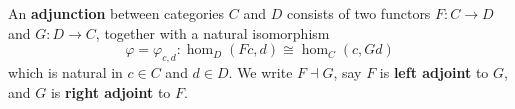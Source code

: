 An \textbf{adjunction} between categories $C$ and $D$ consists of two functors $F: C \rightarrow D$ and $G: D \rightarrow C$, together with a natural isomorphism
\[
\varphi = \varphi_{c,d}: \hom_D(Fc, d) \cong \hom_C(c, Gd)
\]
which is natural in $c \in C$ and $d \in D$. We write $F \dashv G$, say $F$ is \textbf{left adjoint} to $G$, and $G$ is \textbf{right adjoint} to $F$.